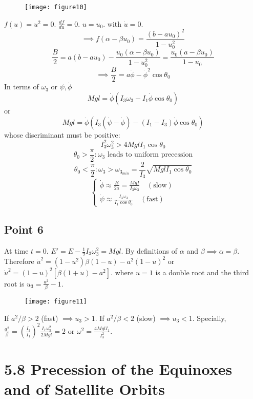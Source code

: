 \documentclass[12pt]{article}
\begin{document}
	\begin{figure}[h]
		\centering
		\texttt{[image: figure10]}
		\caption{}
		\label{fig:figure10}
	\end{figure}
	
	$f(u) = u^2 = 0$. $\frac{df}{du} = 0$. $u=u_0$. with $\dot{u}=0$.
	$$ \implies f(\alpha - \beta u_0) = \frac{(b-au_0)^2}{1-u_0^2} $$
	$$ \frac{B}{2} = a(b-au_0) - \frac{u_0(\alpha - \beta u_0)}{1-u_0^2} = \frac{u_0(a - \beta u_0)}{1-u_0} $$
	$$ \implies \frac{B}{2} = a\dot{\phi} - \dot{\phi}^2\cos\theta_0 $$
	In terms of $\omega_3$ or $\psi, \dot{\phi}$
	$$ Mgl = \dot{\phi}(I_3\omega_3 - I_1\dot{\phi}\cos\theta_0) $$
	or
	$$ Mgl = \dot{\phi}(I_3(\dot{\psi} - \dot{\phi}) - (I_1-I_3)\dot{\phi}\cos\theta_0) $$
	whose discriminant must be positive:
	$$ I_3^2\omega_3^2 > 4Mgl I_1\cos\theta_0 $$
	$$ \theta_0 > \frac{\pi}{2} : \omega_3 \text{ leads to uniform precession} $$
	$$ \theta_0 < \frac{\pi}{2} : \omega_3 > \omega_{3_{min}} = \frac{2}{I_3}\sqrt{MglI_1\cos\theta_0} $$
	$$
	\begin{cases}
		\dot{\phi} \approx \frac{B}{2a} = \frac{MgI}{I_3\omega_3} \quad (\text{slow}) \\
		\dot{\psi} \approx \frac{I_3\omega_3}{I_1\cos\theta_0} \quad (\text{fast})
	\end{cases}
	$$
	
	\subsection*{Point 6}
	At time $t=0$.
	$E' = E - \frac{1}{2}I_3\omega_3^2 = Mgl$.
	By definitions of $\alpha$ and $\beta \implies \alpha = \beta$.
	Therefore $\dot{u}^2 = (1-u^2)\beta(1-u) - a^2(1-u)^2$
	or $\dot{u}^2 = (1-u)^2[\beta(1+u)-a^2]$.
	where $u=1$ is a double root and the third root is $u_3 = \frac{a^2}{\beta}-1$. 
	
	\begin{figure}[h]
		\centering
		\texttt{[image: figure11]}
		\caption{}
		\label{fig:figure11}
	\end{figure}
	
	If $a^2/\beta > 2$ (fast) $\implies u_3 > 1$.
	If $a^2/\beta < 2$ (slow) $\implies u_3 < 1$.
	Specially, $\frac{a^2}{\beta} = \left(\frac{I_3}{I_1}\right)^2 \frac{I_1\omega_3^2}{2Mgl} = 2$
	or $\omega^2 = \frac{4MglI_1}{I_3^2}$.
	\section*{5.8 Precession of the Equinoxes and of Satellite Orbits}
	
\end{document}
